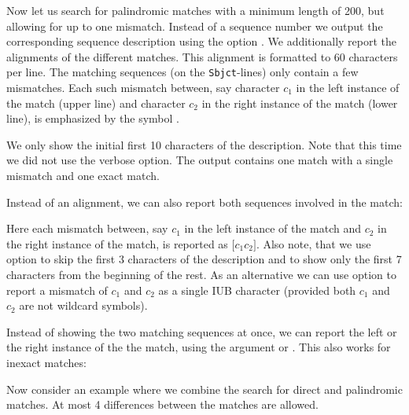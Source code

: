 \documentclass[12pt,titlepage]{article}
\newcommand{\EXECUTE}[1]{}
\begin{document}
\begin{AboutVmatch}
Now let us search for palindromic matches with a minimum length of 200, but
allowing for up to one mismatch. Instead of a sequence number we output 
the corresponding sequence description using 
the option . 
We additionally report the alignments of the different matches. 
This alignment is formatted to 60 characters per line. 
The matching sequences (on the \texttt{Sbjct}-lines) only contain 
a few mismatches. Each such mismatch between, say character
\(c_{1}\) in the left instance of the match (upper line) and character
\(c_{2}\) in the right instance of the match (lower line), is 
emphasized by the symbol \texttt{}.

\EXECUTE{vmatch -p -l 200 -h 1 -showdesc 10 -s 60 atEST}

We only show the initial first 10 characters of the description. 
Note that this time we did not use the verbose option. The 
output contains one match with a single mismatch and one exact match. 

Instead of an alignment, we can also report both sequences involved
in the match:

\EXECUTE{vmatch -p -l 230 -hxdrop 3 -showdesc '(3,7)' -s abbrev atEST}

Here each mismatch between,
say \(c_{1}\) in the left instance of the match and \(c_{2}\) 
in the right instance of the match, is reported as
$\mathtt{\lbrack}c_{1}c_{2}\mathtt{\rbrack}$. Also note, that
we use option  to skip the first
3 characters of the description and to show only the first
7 characters from the beginning of the rest.
As an alternative we can use option  
to report a mismatch of $c_{1}$ and $c_{2}$ as a 
single IUB character (provided both $c_{1}$ and $c_{2}$ are not wildcard
symbols).

\EXECUTE{vmatch -p -l 230 -hxdrop 3 -showdesc '(3,7)' -s abbreviub atEST}

Instead of showing the two matching sequences at once, we can report
the left or the right instance of the the match, using the argument
 or . This also works
for inexact matches:

\EXECUTE{vmatch -p -l 379 -exdrop 3 -s 60 leftseq atEST}

Now consider an example where we combine 
the search for direct and palindromic matches. 
At most 4 differences between the matches are allowed.

\EXECUTE{vmatch -d -p -l 300 -e 4 -showdesc 10 atEST | multipart.pl 0 10 174 175}


\end{AboutVmatch}
\end{document}
